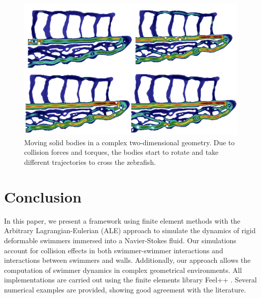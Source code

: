 \documentclass[graybox]{svmult}
\begin{document}


\begin{figure}
	\centering
	\includegraphics[width=0.85\linewidth]{img-zf-zf.png}

	\caption{Moving solid bodies in a complex two-dimensional geometry. Due to collision forces and torques, the bodies start to rotate and take different trajectories to cross the zebrafish.}
	\label{Fig:insertion2D}
\end{figure}



\section{Conclusion}

\color{black}
In this paper, we present a framework using finite element methods with the Arbitrary Lagrangian-Eulerian (ALE) approach to simulate the dynamics of rigid deformable swimmers immersed into a Navier-Stokes fluid. Our simulations account for collision effects in both swimmer-swimmer interactions and interactions between swimmers and walls. Additionally, our approach allows the computation of swimmer dynamics in complex geometrical environments. All implementations are carried out using the finite elements library Feel++ \cite{prudhomme_feelppfeelpp_2023}. Several numerical examples are provided, showing good agreement with the literature.
\color{black}
\end{document}
